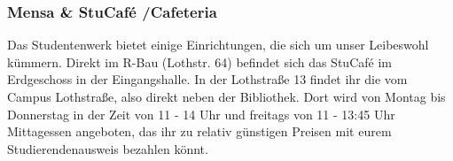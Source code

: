 \subsubsection{Mensa \& StuCafé /Cafeteria}
Das Studentenwerk bietet einige Einrichtungen, die sich um unser 
Leibeswohl kümmern. Direkt im R-Bau (Lothstr. 64) befindet sich das 
StuCafé im Erdgeschoss in der Eingangshalle. \doublebreak
In der Lothstraße 13 findet ihr die  vom Campus Lothstraße, 
also direkt neben der Bibliothek. Dort wird von Montag bis 
Donnerstag in der Zeit von 11 - 14 Uhr und freitags von 11 - 13:45 Uhr 
Mittagessen angeboten, das ihr zu relativ günstigen Preisen mit eurem 
Studierendenausweis bezahlen könnt. 